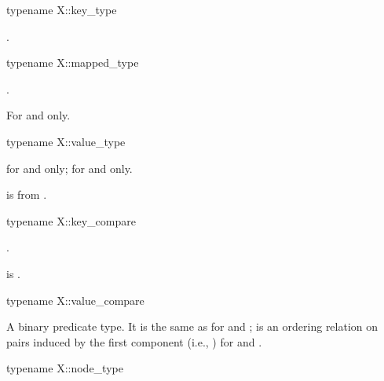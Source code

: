 %
\begin{itemdecl}
typename X::key_type
\end{itemdecl}

\begin{itemdescr}
\pnum
\result
{}.
\end{itemdescr}

%
\begin{itemdecl}
typename X::mapped_type
\end{itemdecl}

\begin{itemdescr}
\pnum
\result
{}.

\pnum
\remarks
For  and  only.
\end{itemdescr}

%
\begin{itemdecl}
typename X::value_type
\end{itemdecl}

\begin{itemdescr}
\pnum
\result
{} for  and  only;
 for  and  only.

\pnum
\expects
{} is  from .
\end{itemdescr}

%
\begin{itemdecl}
typename X::key_compare
\end{itemdecl}

\begin{itemdescr}
\pnum
\result
{}.

\pnum
\expects
{} is .
\end{itemdescr}

%
\begin{itemdecl}
typename X::value_compare
\end{itemdecl}

\begin{itemdescr}
\pnum
\result
A binary predicate type.
It is the same as  for  and
; is an ordering relation on pairs induced by the
first component (i.e., ) for  and .
\end{itemdescr}

%
\begin{itemdecl}
typename X::node_type
\end{itemdecl}

